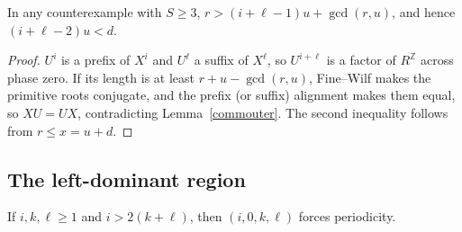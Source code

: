 \begin{corollary}\label{outerbound}
In any counterexample with \(S\ge3\), \(r>(i+\ell-1)u+\gcd(r,u)\), and hence \((i+\ell-2)u<d\).
\end{corollary}
\begin{proof}
\(U^i\) is a prefix of \(X^i\) and \(U^\ell\) a suffix of \(X^\ell\), so \(U^{i+\ell}\) is a factor of \(R^{\mathbb Z}\) across phase zero. If its length is at least \(r+u-\gcd(r,u)\), Fine--Wilf makes the primitive roots conjugate, and the prefix (or suffix) alignment makes them equal, so \(XU=UX\), contradicting Lemma~\ref{commouter}. The second inequality follows from \(r\le x=u+d\).
\end{proof}

\subsection{The left-dominant region}
\begin{theorem}\label{leftdom}
If \(i,k,\ell\ge1\) and \(i>2(k+\ell)\), then \((i,0,k,\ell)\) forces periodicity.
\end{theorem}

